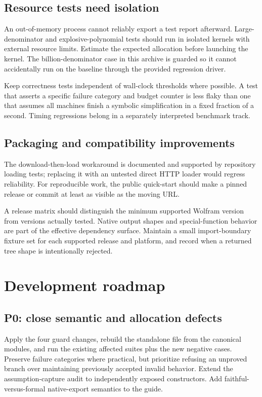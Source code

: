 \documentclass[11pt,a4paper]{article}
\newcommand{\code}[1]{\texttt{\detokenize{#1}}}
\begin{document}
\subsection{Resource tests need isolation}
An out-of-memory process cannot reliably export a test report afterward. Large-denominator and explosive-polynomial tests should run in isolated kernels with external resource limits. Estimate the expected allocation before launching the kernel. The billion-denominator case in this archive is guarded so it cannot accidentally run on the baseline through the provided regression driver.

Keep correctness tests independent of wall-clock thresholds where possible. A test that asserts a specific failure category and budget counter is less flaky than one that assumes all machines finish a symbolic simplification in a fixed fraction of a second. Timing regressions belong in a separately interpreted benchmark track.

\subsection{Packaging and compatibility improvements}
The download-then-load workaround is documented and supported by repository loading tests; replacing it with an untested direct HTTP loader would regress reliability. For reproducible work, the public quick-start should make a pinned release or commit at least as visible as the moving \code{main} URL.\cite{development,guide}

A release matrix should distinguish the minimum supported Wolfram version from versions actually tested. Native \code{Series} output shapes and special-function behavior are part of the effective dependency surface. Maintain a small import-boundary fixture set for each supported release and platform, and record when a returned tree shape is intentionally rejected.

\section{Development roadmap}

\subsection{P0: close semantic and allocation defects}
Apply the four guard changes, rebuild the standalone file from the canonical modules, and run the existing affected suites plus the new negative cases. Preserve failure categories where practical, but prioritize refusing an unproved branch over maintaining previously accepted invalid behavior. Extend the assumption-capture audit to independently exposed constructors. Add faithful-versus-formal native-export semantics to the guide.
\end{document}
